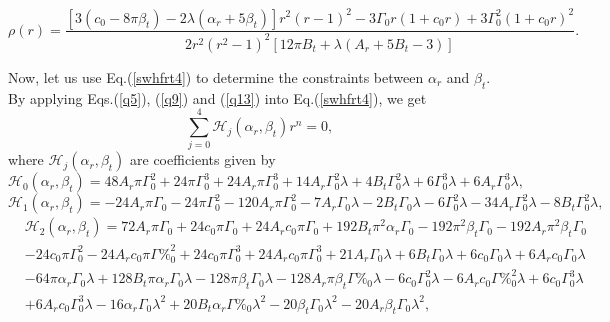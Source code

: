 \documentclass[aps,preprint,onecolumn,11pt,showkeys]{revtex4}%
\begin{document}
\begin{equation}
\rho(r)=\frac{\left[  3(c_{0}-8\pi\beta_{t})-2\lambda(\alpha_{r}+5\beta
_{t})\right]  r^{2}(r-1)^{2}-3\Gamma_{0}r(1+c_{0}r)+3\Gamma_{0}^{2}%
(1+c_{0}r)^{2}}{2r^{2}(r^{2}-1)^{2}\left[  12\pi B_{t}+\lambda\left(
A_{r}+5B_{t}-3\right)  \right]  }. \label{q13}%
\end{equation}

Now, let us use Eq.(\ref{swhfrt4}) to determine the constraints between $\alpha_{r}$
and $\beta_{t}$. By applying Eqs.(\ref{q5}), (\ref{q9}) and (\ref{q13}) into
Eq.(\ref{swhfrt4}), we get%
\begin{equation}
\sum\limits_{j=0}^{4}\mathcal{H}_{j}(\alpha_{r},\beta_{t})r^{n}=0,\label{q14}%
\end{equation}
\noindent where $\mathcal{H}_{j}(\alpha_{r},\beta_{t})$ are coefficients given
by%
\begin{equation}
\left.  \mathcal{H}_{0}(\alpha_{r},\beta_{t})=48A_{r}\pi\text{$\Gamma$}%
_{0}^{2}+24\pi\text{$\Gamma$}_{0}^{3}+24A_{r}\pi\text{$\Gamma$}_{0}%
^{3}+14A_{r}\text{$\Gamma$}_{0}^{2}\lambda+4B_{t}\text{$\Gamma$}_{0}%
^{2}\lambda+6\text{$\Gamma$}_{0}^{3}\lambda+6A_{r}\text{$\Gamma$}_{0}%
^{3}\lambda,\right.
\end{equation}%
\begin{equation}
\left.  \mathcal{H}_{1}(\alpha_{r},\beta_{t})=-24A_{r}\pi\text{$\Gamma$}%
_{0}-24\pi\text{$\Gamma$}_{0}^{2}-120A_{r}\pi\text{$\Gamma$}_{0}^{2}%
-7A_{r}\text{$\Gamma$}_{0}\lambda-2B_{t}\text{$\Gamma$}_{0}\lambda
-6\text{$\Gamma$}_{0}^{2}\lambda-34A_{r}\text{$\Gamma$}_{0}^{2}\lambda
-8B_{t}\text{$\Gamma$}_{0}^{2}\lambda,\right.
\end{equation}%
\begin{align}
&  \left.  \mathcal{H}_{2}(\alpha_{r},\beta_{t})=72A_{r}\pi\text{$\Gamma$}%
_{0}+24c_{0}\pi\text{$\Gamma$}_{0}+24A_{r}c_{0}\pi\text{$\Gamma$}_{0}%
+192B_{t}\pi^{2}\text{$\alpha$}_{r}\text{$\Gamma$}_{0}-192\pi^{2}\text{$\beta
$}_{t}\text{$\Gamma$}_{0}-192A_{r}\pi^{2}\text{$\beta$}_{t}\text{$\Gamma$}%
_{0}\right.  \nonumber\\
&  \left.  -24c_{0}\pi\text{$\Gamma$}_{0}^{2}-24A_{r}c_{0}\pi\text{$\Gamma$%
}_{0}^{2}+24c_{0}\pi\text{$\Gamma$}_{0}^{3}+24A_{r}c_{0}\pi\text{$\Gamma$}%
_{0}^{3}+21A_{r}\text{$\Gamma$}_{0}\lambda+6B_{t}\text{$\Gamma$}_{0}%
\lambda+6c_{0}\text{$\Gamma$}_{0}\lambda+6A_{r}c_{0}\text{$\Gamma$}_{0}%
\lambda\right.  \nonumber\\
&  \left.  -64\pi\text{$\alpha$}_{r}\text{$\Gamma$}_{0}\lambda+128B_{t}%
\pi\text{$\alpha$}_{r}\text{$\Gamma$}_{0}\lambda-128\pi\text{$\beta$}%
_{t}\text{$\Gamma$}_{0}\lambda-128A_{r}\pi\text{$\beta$}_{t}\text{$\Gamma$%
}_{0}\lambda-6c_{0}\text{$\Gamma$}_{0}^{2}\lambda-6A_{r}c_{0}\text{$\Gamma$%
}_{0}^{2}\lambda+6c_{0}\text{$\Gamma$}_{0}^{3}\lambda\right.  \nonumber\\
&  \left.  +6A_{r}c_{0}\text{$\Gamma$}_{0}^{3}\lambda-16\text{$\alpha$}%
_{r}\text{$\Gamma$}_{0}\lambda^{2}+20B_{t}\text{$\alpha$}_{r}\text{$\Gamma$%
}_{0}\lambda^{2}-20\text{$\beta$}_{t}\text{$\Gamma$}_{0}\lambda^{2}%
-20A_{r}\text{$\beta$}_{t}\text{$\Gamma$}_{0}\lambda^{2},\right.
\end{align}%
\end{document}
